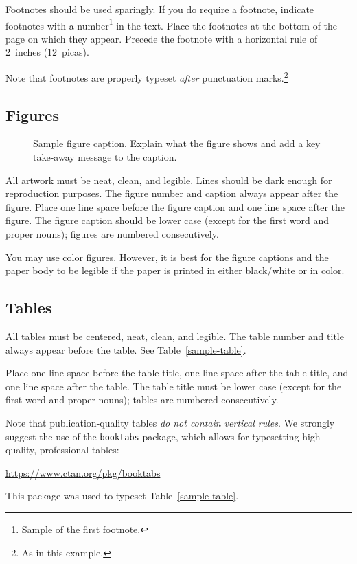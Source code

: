 \documentclass{article}
\begin{document}
Footnotes should be used sparingly.  If you do require a footnote, indicate
footnotes with a number\footnote{Sample of the first footnote.} in the
text. Place the footnotes at the bottom of the page on which they appear.
Precede the footnote with a horizontal rule of 2~inches (12~picas).


Note that footnotes are properly typeset \emph{after} punctuation
marks.\footnote{As in this example.}


\subsection{Figures}


\begin{figure}
  \centering
  \fbox{\rule[-.5cm]{0cm}{4cm} \rule[-.5cm]{4cm}{0cm}}
  \caption{Sample figure caption. Explain what the figure shows and add a key take-away message to the caption.}
\end{figure}


All artwork must be neat, clean, and legible. Lines should be dark enough for
 reproduction purposes. The figure number and caption always appear after the
figure. Place one line space before the figure caption and one line space after
the figure. The figure caption should be lower case (except for the first word and proper nouns); figures are numbered consecutively.


You may use color figures.  However, it is best for the figure captions and the
paper body to be legible if the paper is printed in either black/white or in
color.


\subsection{Tables}


All tables must be centered, neat, clean, and legible.  The table number and
title always appear before the table.  See Table~\ref{sample-table}.


Place one line space before the table title, one line space after the
table title, and one line space after the table. The table title must
be lower case (except for the first word and proper nouns); tables are
numbered consecutively.


Note that publication-quality tables \emph{do not contain vertical rules}. We
strongly suggest the use of the \verb+booktabs+ package, which allows for
typesetting high-quality, professional tables:
\begin{center}
  \url{https://www.ctan.org/pkg/booktabs}
\end{center}
This package was used to typeset Table~\ref{sample-table}.
\end{document}
